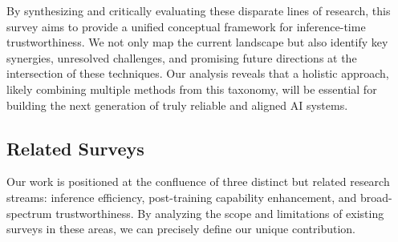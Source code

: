 
By synthesizing and critically evaluating these disparate lines of research, this survey aims to provide a unified conceptual framework for inference-time trustworthiness. We not only map the current landscape but also identify key synergies, unresolved challenges, and promising future directions at the intersection of these techniques. Our analysis reveals that a holistic approach, likely combining multiple methods from this taxonomy, will be essential for building the next generation of truly reliable and aligned AI systems.

\subsection{Related Surveys}
Our work is positioned at the confluence of three distinct but related research streams: inference efficiency, post-training capability enhancement, and broad-spectrum trustworthiness. By analyzing the scope and limitations of existing surveys in these areas, we can precisely define our unique contribution. 


